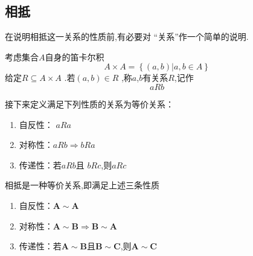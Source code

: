\subsection{相抵}
在说明相抵这一关系的性质前,有必要对
“关系”作一个简单的说明.
\begin{formal}
    \begin{definition}[关系]\label{def:关系}
考虑集合$A$自身的笛卡尔积
\[
A \times A = \left\{
    \left(a,b\right) | 
    a,b \in A
\right\}
\]
给定$R \subseteq  A \times A$
.若$\left(a,b\right) \in R$
,称$a$,$b$有关系$R$,记作
\[
a R b
\]
    \end{definition}\end{formal}
    \begin{formal}
    \begin{definition}[等价关系]\label{def:等价关系}
接下来定义满足下列性质的关系为等价关系：
\begin{enumerate}[label=\textup{(\arabic*)}]
    \item 自反性： $aRa$
    \item 对称性：$aRb\Longrightarrow 
    bRa$
    \item 传递性：若$aRb$且
    $bRc$,则$aRc$ 
\end{enumerate}
    \end{definition}\end{formal}
    \begin{formal}
    \begin{proposition}[相抵的性质]\label{prop:相抵的性质}
相抵是一种等价关系,即满足上述三条性质
 \begin{enumerate}[label=\textup{(\arabic*)}]
   \item 自反性：$ \bm{A} 
    \sim \bm{A}$
     \item 对称性：$\bm{A} \sim
     \bm{B}\Longrightarrow 
     \bm{B}
    \sim \bm{A}$
     \item 传递性：若$\bm{A}\sim
     \bm{B}$且$
     \bm{B} \sim \bm{C}
     $,则$\bm{A} \sim
    \bm{C}$ 
\end{enumerate}
 \end{proposition}
    \end{formal}
